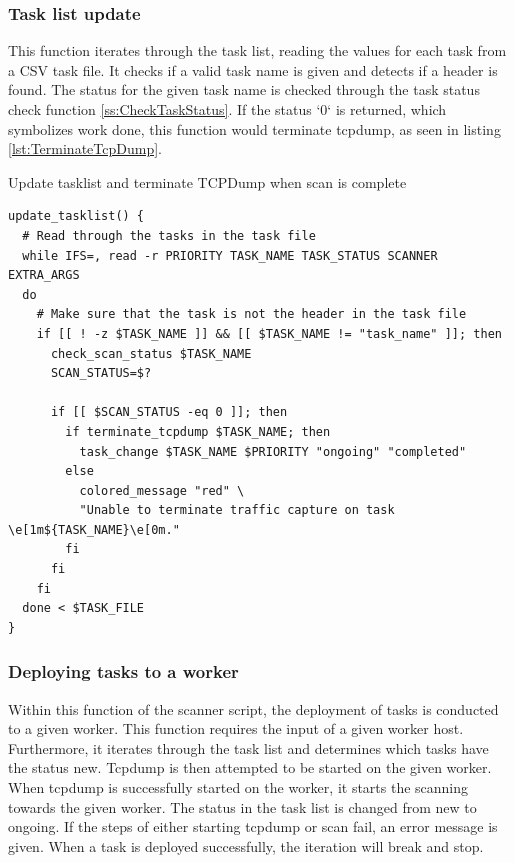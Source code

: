 \subsubsection{Task list update}
\label{ss:TaskListUpdate}
This function iterates through the task list, reading the values for each task from a CSV task file.
It checks if a valid task name is given and detects if a header is found.
The status for the given task name is checked through the task status check function \ref{ss:CheckTaskStatus}.
If the status `0` is returned, which symbolizes work done, this function would terminate tcpdump, as seen in listing  \ref{lst:TerminateTcpDump}.

\begin{listing}[!ht]
\caption{Update tasklist and terminate TCPDump when scan is complete}
\label{lst:UpdateTasklist}
\begin{verbatim}
update_tasklist() {
  # Read through the tasks in the task file
  while IFS=, read -r PRIORITY TASK_NAME TASK_STATUS SCANNER EXTRA_ARGS
  do
    # Make sure that the task is not the header in the task file
    if [[ ! -z $TASK_NAME ]] && [[ $TASK_NAME != "task_name" ]]; then
      check_scan_status $TASK_NAME
      SCAN_STATUS=$?

      if [[ $SCAN_STATUS -eq 0 ]]; then
        if terminate_tcpdump $TASK_NAME; then
          task_change $TASK_NAME $PRIORITY "ongoing" "completed"
        else
          colored_message "red" \
          "Unable to terminate traffic capture on task \e[1m${TASK_NAME}\e[0m."
        fi
      fi
    fi
  done < $TASK_FILE
}
\end{verbatim}
\end{listing}

\subsubsection{Deploying tasks to a worker}
\label{ss:DeployingTasks}
Within this function of the scanner script, the deployment of tasks is conducted to a given worker.
This function requires the input of a given worker host.
Furthermore, it iterates through the task list and determines which tasks have the status new.
Tcpdump is then attempted to be started on the given worker.
When tcpdump is successfully started on the worker, it starts the scanning towards the given worker.
The status in the task list is changed from new to ongoing.
If the steps of either starting tcpdump or scan fail, an error message is given.
When a task is deployed successfully, the iteration will break and stop.

